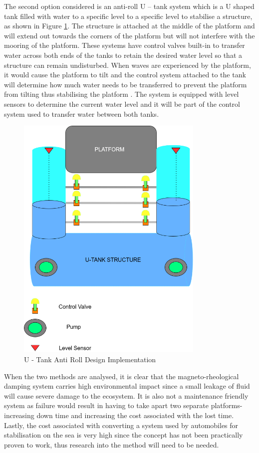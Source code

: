 \documentclass[11pt]{article}
\numberwithin{equation}{section}
\begin{document}
The second option considered is an anti-roll U – tank system which is a U shaped tank filled with water to a specific level to a specific level to stabilise a structure, as shown in Figure \ref{u_tank}. The structure is attached at the middle of the platform and will extend out towards the corners of the platform but will not interfere with the mooring of the platform. These systems have control valves built-in to transfer water across both ends of the tanks to retain the desired water level so that a structure can remain undisturbed. When waves are experienced by the platform, it would cause the platform to tilt and the control system attached to the tank will determine how much water needs to be transferred to prevent the platform from tilting thus stabilising the platform \cite[][6s]{5s}. The system is equipped with level sensors to determine the current water level and it will be part of the control system used to transfer water between both tanks.

\begin{figure}[H]
\centering
\includegraphics[width=0.8\textwidth]{Figures/u_tank.png}
\caption{\label{u_tank}U - Tank Anti Roll Design Implementation}
\end{figure}

When the two methods are analysed, it is clear that the magneto-rheological damping system carries high environmental impact since a small leakage of fluid will cause severe damage to the ecosystem. It is also not a maintenance friendly system as failure would result in having to take apart two separate platforms- increasing down time and increasing the cost associated with the lost time. Lastly, the cost associated with converting a system used by automobiles for stabilisation on the sea is very high since the concept has not been practically proven to work, thus research into the method will need to be needed.
\end{document}
